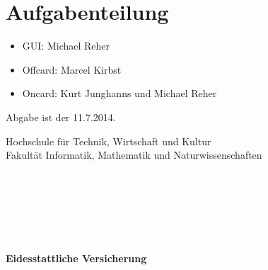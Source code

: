 \documentclass[a4paper,12pt]{article}
\begin{document}
\section{Aufgabenteilung}

\begin{itemize}
\item{GUI:} Michael Reher
\item{Offcard:} Marcel Kirbst
\item{Oncard:} Kurt Junghanns und Michael Reher
\end{itemize}

Abgabe ist der 11.7.2014.





\newpage
{}
\setcounter{page}{5} 



\newpage
\thispagestyle{empty}
\begin{center}
\Large{Hochschule für Technik, Wirtschaft und Kultur\\
Fakultät Informatik, Mathematik und Naturwissenschaften }\\
\end{center}

\begin{verbatim}






\end{verbatim}

\begin{center}
\textbf{\LARGE{Eidesstattliche Versicherung}}
\end{center}
\begin{verbatim}


\end{verbatim}
\end{document}
